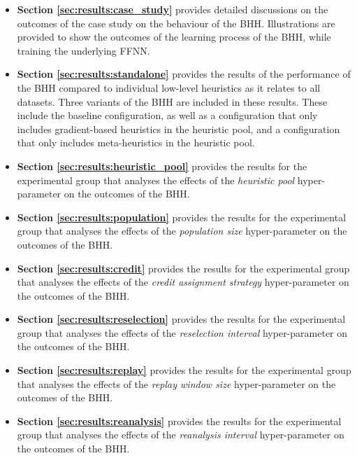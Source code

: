 \begin{itemize}
	\item \textbf{Section \ref{sec:results:case_study}} provides detailed discussions on the outcomes of the case study on the behaviour of the \acs{BHH}. Illustrations are provided to show the outcomes of the learning process of the \acs{BHH}, while training the underlying \acf{FFNN}.

	\item \textbf{Section \ref{sec:results:standalone}} provides the results of the performance of the \acs{BHH} compared to individual low-level heuristics as it relates to all datasets. Three variants of the \acs{BHH} are included in these results. These include the baseline configuration, as well as a configuration that only includes gradient-based heuristics in the heuristic pool, and a configuration that only includes meta-heuristics in the heuristic pool.

	\item \textbf{Section \ref{sec:results:heuristic_pool}} provides the results for the experimental group that analyses the effects of the \textit{heuristic pool} hyper-parameter on the outcomes of the \acs{BHH}.

	\item \textbf{Section \ref{sec:results:population}} provides the results for the experimental group that analyses the effects of the \textit{population size} hyper-parameter on the outcomes of the \acs{BHH}.

	\item \textbf{Section \ref{sec:results:credit}} provides the results for the experimental group that analyses the effects of the \textit{credit assignment strategy} hyper-parameter on the outcomes of the \acs{BHH}.

	\item \textbf{Section \ref{sec:results:reselection}} provides the results for the experimental group that analyses the effects of the \textit{reselection interval} hyper-parameter on the outcomes of the \acs{BHH}.

	\item \textbf{Section \ref{sec:results:replay}} provides the results for the experimental group that analyses the effects of the \textit{replay window size} hyper-parameter on the outcomes of the \acs{BHH}.

	\item \textbf{Section \ref{sec:results:reanalysis}} provides the results for the experimental group that analyses the effects of the \textit{reanalysis interval} hyper-parameter on the outcomes of the \acs{BHH}.


\end{itemize}
